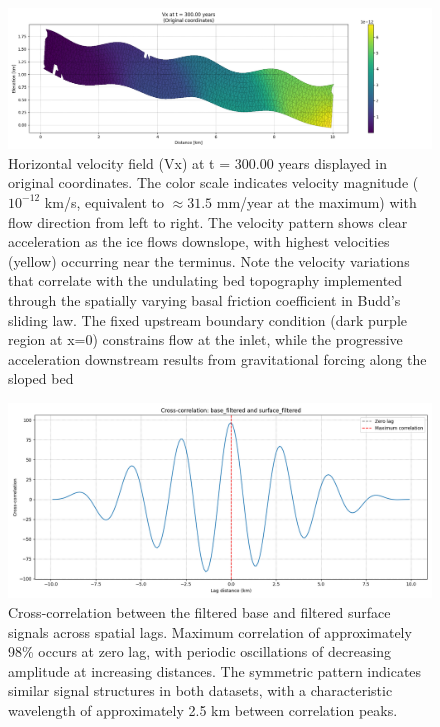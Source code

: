 \begin{figure}
    \includegraphics[scale=0.45]{Vx_300yrs_xz.png}
    \caption{Horizontal velocity field (Vx) at t = 300.00 years displayed in original coordinates. The color scale indicates velocity magnitude ($10^{-12}$ km/s, equivalent to $\approx 31.5$ mm/year at the maximum) with flow direction from left to right. The velocity pattern shows clear acceleration as the ice flows downslope, with highest velocities (yellow) occurring near the terminus. Note the velocity variations that correlate with the undulating bed topography implemented through the spatially varying basal friction coefficient in Budd's sliding law. The fixed upstream boundary condition (dark purple region at x=0) constrains flow at the inlet, while the progressive acceleration downstream results from gravitational forcing along the sloped bed}
    \label{fig:Vx}
\end{figure}

\begin{figure}
    \includegraphics[scale=0.5]{xcorr_filtered.png}
    \caption{Cross-correlation between the filtered base and filtered surface signals across spatial lags. Maximum correlation of approximately 98\% occurs at zero lag, with periodic oscillations of decreasing amplitude at increasing distances. The symmetric pattern indicates similar signal structures in both datasets, with a characteristic wavelength of approximately 2.5 km between correlation peaks.}
    \label{fig:xcorr_filtered}
\end{figure}

